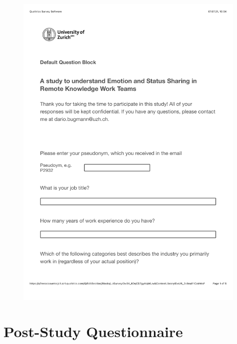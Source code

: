 \begin{figure}[h]
    \centering
    \includegraphics[width=\linewidth, page=5]{./documents/prestudy_questionnaire.pdf}
\end{figure}


\chapter{Post-Study Questionnaire}
\label{chapter:poststudy_questionnaire}

